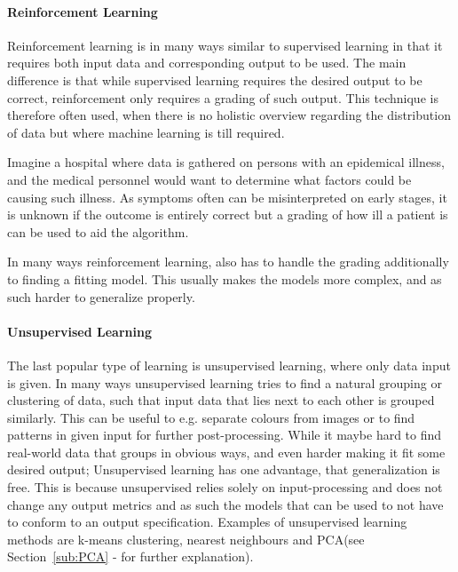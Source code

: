 \paragraph{Reinforcement Learning}
\label{par:ReinforcementLearning}
Reinforcement learning is in many ways similar to supervised learning in that it requires both input data and corresponding output to be used.
The main difference is that while supervised learning requires the desired output to be correct, reinforcement only requires a grading of such output.
This technique is therefore often used, when there is no holistic overview regarding the distribution of data but where machine learning is till required.
\begin{exm}
Imagine a hospital where data is gathered on persons with an epidemical illness, and the
medical personnel would want to determine what factors could be causing such illness. As symptoms often can be misinterpreted on early stages,
it is unknown if the outcome is entirely correct but a grading of how ill a patient is can be used to aid the algorithm.
\end{exm}
In many ways reinforcement learning, also has to handle the grading additionally to finding a fitting model. 
This usually makes the models more complex, and as such harder to generalize properly\cite{sutton96generalizationin}\cite{boyan95generalizationin}.

\paragraph{Unsupervised Learning}
\label{par:UnsupervisedLearning}
The last popular type of learning is unsupervised learning, where only data input is given.
In many ways unsupervised learning tries to find a natural grouping or clustering of data,
such that input data that lies next to each other is grouped similarly.
This can be useful to e.g. separate colours from images or to find patterns in given input for further post-processing.
While it maybe hard to find real-world data that groups in obvious ways, and even harder making it fit some desired output;
Unsupervised learning has one advantage, that generalization is free. This is because unsupervised relies solely on input-processing and does not change
any output metrics and as such the models that can be used to not have to conform to an output specification.
Examples of unsupervised learning methods are k-means clustering\cite{learningfromdata2012book}, nearest neighbours\cite{scikitlearn2012nearestneighbours} and PCA\cite{smith2002tutorial}(see Section~\ref{sub:PCA} -  for further explanation).

